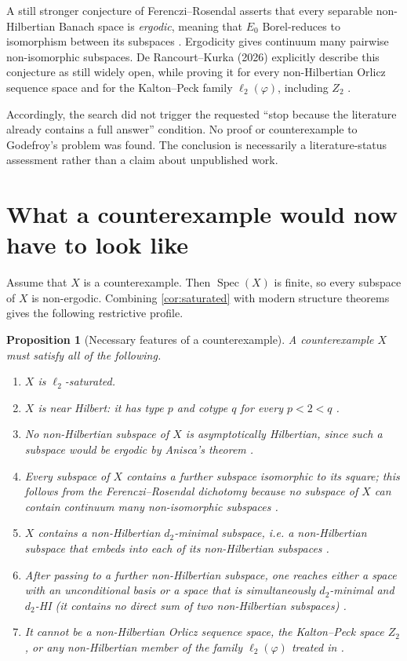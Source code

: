 \documentclass[11pt]{article}
\newtheorem{proposition}[theorem]{Proposition}
\theoremstyle{definition}
\theoremstyle{remark}
\newcommand{\ellTwo}{\ell_2}
\newcommand{\Spec}{\operatorname{Spec}}
\newcommand{\Ezero}{E_0}
\begin{document}
A still stronger conjecture of Ferenczi--Rosendal asserts that every separable non-Hilbertian Banach space is \emph{ergodic}, meaning that \(\Ezero\) Borel-reduces to isomorphism between its subspaces \cite{FRergodic}.  Ergodicity gives continuum many pairwise non-isomorphic subspaces.  De Rancourt--Kurka (2026) explicitly describe this conjecture as still widely open, while proving it for every non-Hilbertian Orlicz sequence space and for the Kalton--Peck family \(\ell_2(\varphi)\), including \(Z_2\) \cite{dRK2026}.

Accordingly, the search did not trigger the requested ``stop because the literature already contains a full answer'' condition.  No proof or counterexample to Godefroy's problem was found.  The conclusion is necessarily a literature-status assessment rather than a claim about unpublished work.

\section{What a counterexample would now have to look like}

Assume that \(X\) is a counterexample.  Then \(\Spec(X)\) is finite, so every subspace of \(X\) is non-ergodic.  Combining \cref{cor:saturated} with modern structure theorems gives the following restrictive profile.

\begin{proposition}[Necessary features of a counterexample]\label{prop:profile}
A counterexample \(X\) must satisfy all of the following.
\begin{enumerate}
  \item \(X\) is \(\ellTwo\)-saturated.
  \item \(X\) is near Hilbert: it has type \(p\) and cotype \(q\) for every \(p<2<q\) \cite{Cuellar2018}.
  \item No non-Hilbertian subspace of \(X\) is asymptotically Hilbertian, since such a subspace would be ergodic by Anisca's theorem \cite{Anisca2010}.
  \item Every subspace of \(X\) contains a further subspace isomorphic to its square; this follows from the Ferenczi--Rosendal dichotomy because no subspace of \(X\) can contain continuum many non-isomorphic subspaces \cite[Corollary 14]{FRnumber}.
  \item \(X\) contains a non-Hilbertian \(d_2\)-minimal subspace, i.e. a non-Hilbertian subspace that embeds into each of its non-Hilbertian subspaces \cite[Theorem 6.5]{CCRF2023}.
  \item After passing to a further non-Hilbertian subspace, one reaches either a space with an unconditional basis or a space that is simultaneously \(d_2\)-minimal and \(d_2\)-HI (it contains no direct sum of two non-Hilbertian subspaces) \cite[Theorem 6.23]{CCRF2023}.
  \item It cannot be a non-Hilbertian Orlicz sequence space, the Kalton--Peck space \(Z_2\), or any non-Hilbertian member of the family \(\ell_2(\varphi)\) treated in \cite{dRK2026}.
\end{enumerate}
\end{proposition}
\end{document}
